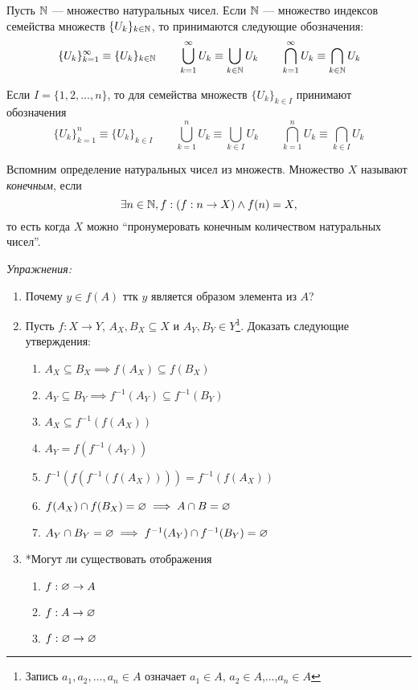 Пусть $\mathbb N$ --- множество натуральных чисел. Если $\mathbb N$ --- множество индексов
семейства множеств $\{U_{k}\}_{k\in\mathbb N}$, то принимаются следующие обозначения:
\[
	\{U_{k}\}_{k=1}^{\infty}\equiv\{U_{k}\}_{k\in\mathbb N}\qquad
	\bigcup_{k=1}^{\infty}U_{k}\equiv\bigcup_{k\in\mathbb N}U_{k}\qquad
	\bigcap_{k=1}^{\infty}U_{k}\equiv\bigcap_{k\in\mathbb N}U_{k}
\]

Если $I=\{1,2,...,n\}$, то для семейства множеств $\{U_{k}\}_{k\in I}$ принимают
обозначения
\[
	\{U_{k}\}_{k=1}^{n}\equiv\{U_{k}\}_{k\in I}\qquad
	\bigcup_{k=1}^{n}U_{k}\equiv\bigcup_{k\in I}U_{k}\qquad
	\bigcap_{k=1}^{n}U_{k}\equiv\bigcap_{k\in I}U_{k}
\]

Вспомним определение натуральных чисел из множеств.
Множество $X$ называют {\it конечным}, если
\[
	\exists n\in\mathbb N,f:(f:n\to X)\land f(n)=X,
\]
то есть когда $X$ можно ``пронумеровать конечным количеством натуральных чисел''.

\vspace{1em}
{\it Упражнения:}
\begin{enumerate}
	\item{}Почему $y\in f(A)$ ттк $y$ является образом элемента из $A$?
	\item{}Пусть ${f:X\to Y}$, ${A_{X},B_{X}\subseteq X}$ и
		${A_{Y},B_{Y}\in Y}$\footnote{Запись $a_1,a_2,...,a_{n}\in A$ означает
		$a_1\in A$, $a_2\in A$,...,$a_{n}\in A$}.
		Доказать следующие утверждения:
		\begin{enumerate}
			\item{}$A_{X}\subseteq B_{X}\implies f(A_{X})\subseteq f(B_{X})$
			\item{}$A_{Y}\subseteq B_{Y}\implies f^{-1}(A_{Y})\subseteq f^{-1}(B_{Y})$
			\item{}$A_{X}\subseteq f^{-1}(f(A_{X}))$
			\item{}$A_{Y}=f(f^{-1}(A_{Y}))$
			\item{}$f^{-1}(f(f^{-1}(f(A_{X}))))=f^{-1}(f(A_{X}))$
			\item{}$f(A_{X})\cap f(B_{X})=\varnothing\implies A\cap B=\varnothing$
			\item{}$A_{Y}\cap B_{Y}=\varnothing\implies f^{-1}(A_{Y})\cap f^{-1}(B_{Y})=\varnothing$
		\end{enumerate}
	\item{}*Могут ли существовать отображения
		\begin{multicols}{3}
			\begin{enumerate}
				\item{}$f:\varnothing\to A$
				\item{}$f:A\to\varnothing$
				\item{}$f:\varnothing\to\varnothing$
			\end{enumerate}
		\end{multicols}
\end{enumerate}

